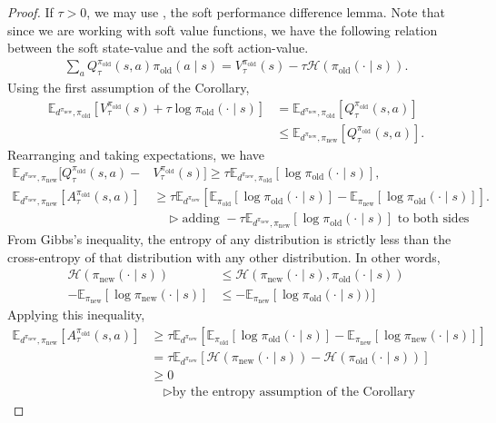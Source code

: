 \documentclass[twoside,11pt]{article}
\newcommand{\Ex}{\mathbb{E}}
\newcommand{\entropy}{\mathcal{H}}
\newcommand{\pinew}{{\pi_\mathrm{new}}}
\newcommand{\piold}{{\pi_\mathrm{old}}}
\begin{document}
\begin{proof}
If $\tau > 0$, we may use , the soft performance difference lemma. Note that since we are working with soft value functions, we have the following relation between the soft state-value and the soft action-value. 
\begin{align*}
    \sum_a Q_\tau^\piold(s, a) \piold(a \mid s) = V_\tau^\piold(s) - \tau \entropy(\piold(\cdot \mid s)).
\end{align*}
Using the first assumption of the Corollary,
\begin{align*}
    \Ex_{d^\pinew, \piold}[V_\tau^\piold(s) + \tau \log\piold(\cdot \mid s)] &= \Ex_{d^\pinew, \piold}[ Q_\tau^\piold(s, a)] \\
    &\leq \Ex_{d^\pinew, \pinew}[ Q_\tau^\piold(s, a)].
\end{align*}
Rearranging and taking expectations, we have
\begin{align*}
    \Ex_{d^\pinew, \pinew}[Q_\tau^\piold(s, a) -& V_\tau^\piold(s)] \geq \tau \Ex_{d^\pinew, \piold}[\log \piold(\cdot \mid s)],\\
    \Ex_{d^\pinew, \pinew}[A_\tau^\piold(s, a)] &\geq \tau \Ex_{d^\pinew}[\Ex_{\piold}[\log \piold(\cdot \mid s)] - \Ex_{\pinew}[\log \piold(\cdot \mid s)]].\\
    &\quad \triangleright \text{adding } -\tau \Ex_{d^\pinew, \pinew}[\log \piold(\cdot \mid s)] \text{ to both sides}
\end{align*}
From Gibbs's inequality, the entropy of any distribution is strictly less than the cross-entropy of that distribution with any other distribution. In other words,
\begin{align*}
    \entropy(\pinew(\cdot \mid s)) &\leq \entropy(\pinew(\cdot \mid s), \piold(\cdot \mid s))\\
    -\Ex_\pinew[\log \pinew(\cdot \mid s)] &\leq - \Ex_\pinew[\log \piold(\cdot \mid s))]
\end{align*}
Applying this inequality,
\begin{align*}
    \Ex_{d^\pinew, \pinew}[A_\tau^\piold(s, a)] &\geq \tau \Ex_{d^\pinew}[\Ex_{\piold}[\log \piold(\cdot \mid s)] - \Ex_{\pinew}[\log \pinew(\cdot \mid s)]]\\
    &= \tau \Ex_{d^\pinew}[ \entropy (\pinew(\cdot \mid s)) - \entropy(\piold(\cdot \mid s))]\\
    &\geq 0\\
    &\quad \triangleright \text{by the entropy assumption of the Corollary}
\end{align*}
\end{proof}
\end{document}
